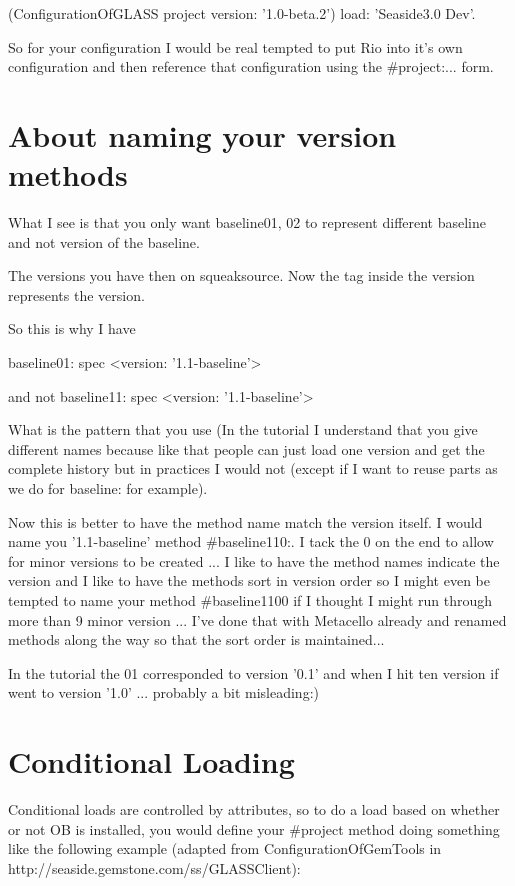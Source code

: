 \documentclass[a4paper,10pt,twoside]{book}
\begin{document}
 (ConfigurationOfGLASS project version: '1.0-beta.2') load: 'Seaside3.0 Dev'.

So for your configuration I would be real tempted to put Rio into it's own configuration and then reference that configuration using the \#project:... form.



\section{About naming your version methods}
What I see is that you only want baseline01, 02 to represent different
baseline and not version of the baseline.

The versions you have then on squeaksource. Now the tag inside the version represents the version.

 So this is why I have 

\begin{code}{} 
	baseline01: spec 
 	<version: '1.1-baseline'>
 
 	and not 
 	baseline11: spec 
 	<version: '1.1-baseline'>
\end{code} 

 What is the pattern that you use (In the tutorial I understand that
 you give different names because like that people can just load one
 version and get the complete history but in practices I would not
 (except if I want to reuse parts as we do for baseline: for example).

Now this is better to have the method name match the version itself. I would name you '1.1-baseline' method \#baseline110:. I tack the 0 on the end to allow for minor versions to be created ... I like to have the method names indicate the version and I like to have the methods sort in version order so I might even be tempted to name your method \#baseline1100 if I thought I might run through more than 9 minor version ... I've done that with Metacello already and renamed methods along the way so that the sort order is maintained...

In the tutorial the 01 corresponded to version '0.1' and when I hit ten version if went to version '1.0' ... probably a bit misleading:)

\section{Conditional Loading}
Conditional loads are controlled by attributes, so to do a load based on whether or not OB is installed, you would define your 
\#project method doing something like the following example (adapted from ConfigurationOfGemTools in http://seaside.gemstone.com/ss/GLASSClient):
\end{document}
